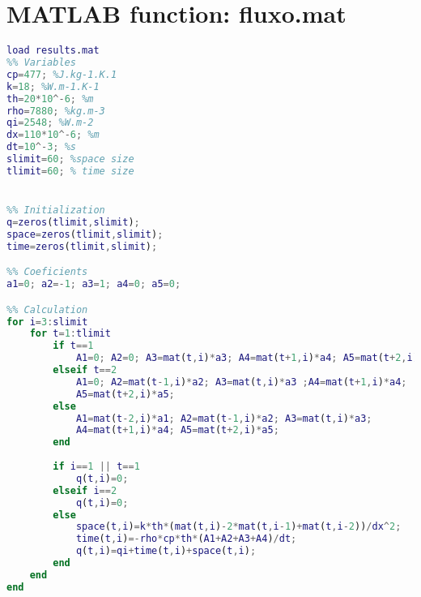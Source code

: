 \chapter{MATLAB function: fluxo.mat}
\label{ap:c}
\begin{lstlisting}[language=matlab]
load results.mat
%% Variables
cp=477; %J.kg-1.K.1
k=18; %W.m-1.K-1
th=20*10^-6; %m
rho=7880; %kg.m-3
qi=2548; %W.m-2
dx=110*10^-6; %m
dt=10^-3; %s
slimit=60; %space size
tlimit=60; % time size


%% Initialization
q=zeros(tlimit,slimit);
space=zeros(tlimit,slimit);
time=zeros(tlimit,slimit);

%% Coeficients
a1=0; a2=-1; a3=1; a4=0; a5=0;

%% Calculation
for i=3:slimit
    for t=1:tlimit
        if t==1
            A1=0; A2=0; A3=mat(t,i)*a3; A4=mat(t+1,i)*a4; A5=mat(t+2,i)*a5;
        elseif t==2
            A1=0; A2=mat(t-1,i)*a2; A3=mat(t,i)*a3 ;A4=mat(t+1,i)*a4; 
            A5=mat(t+2,i)*a5;
        else
            A1=mat(t-2,i)*a1; A2=mat(t-1,i)*a2; A3=mat(t,i)*a3; 
            A4=mat(t+1,i)*a4; A5=mat(t+2,i)*a5;
        end
        
        if i==1 || t==1
            q(t,i)=0;
        elseif i==2
            q(t,i)=0;
        else
            space(t,i)=k*th*(mat(t,i)-2*mat(t,i-1)+mat(t,i-2))/dx^2;
            time(t,i)=-rho*cp*th*(A1+A2+A3+A4)/dt;
            q(t,i)=qi+time(t,i)+space(t,i);
        end
    end
end
\end{lstlisting}